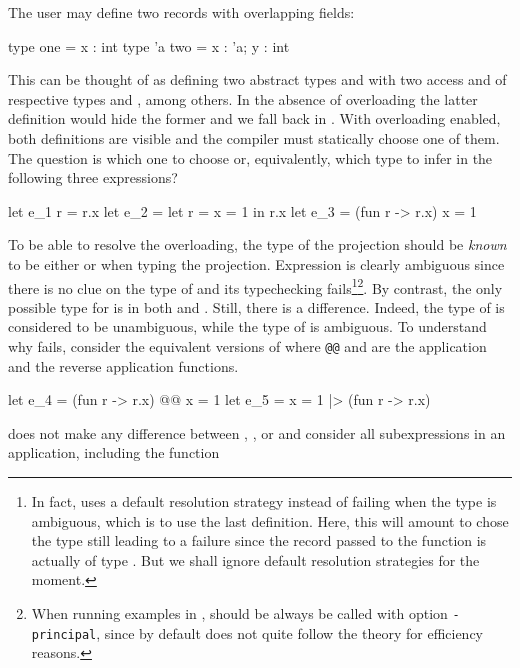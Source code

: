 \documentclass[acmsmall,screen,nonacm]{acmart}
\begin{document}
The user may define two records with overlapping fields:
\begin{program}[input]
type one = {x : int}
type 'a two = {x : 'a; y : int}
\end{program}
This can be thought of as defining two abstract types  and
 with two access  and  of
respective types  and , among
others.
%
In the absence of overloading the latter definition would hide the former
and we fall back in \ML. With overloading enabled, both definitions are
visible and the compiler must statically choose one of them.
%
The question is which one to choose or, equivalently, which type to infer
in the following three expressions? 
\begin{program}[input]
let e_1 r = r.x
let e_2 = let r = {x = 1} in r.x
let e_3 = (fun r -> r.x) {x = 1} 
\end{program}
To be able to resolve the overloading, the type of the projection should be
\emph{known} to be either  or  when typing the
projection.  Expression  is clearly ambiguous since
there is no clue on the type of  and its typechecking
fails\footnote {In fact, \OCaml uses a default resolution strategy instead
of failing when the type is ambiguous, which is to use the last
definition. Here, this will amount to chose the type 
still leading to a failure since the record passed to the function is
actually of type . But we shall ignore default resolution
strategies for the moment.}\footnote {When running examples in \OCaml,
\OCaml should be always be called with option \texttt{-principal}, since by
default \OCaml does not quite follow the theory for efficiency reasons.}.
%
By contrast, the only possible
type for  is  in both  and .
Still, there is a difference.  Indeed, the type of  is considered
to be unambiguous, while the type of  is ambiguous. To
understand why  fails, consider the equivalent versions of
 where \texttt{@@} and \ocaml{|>} are the application and the
reverse application functions.
\begin{program}[input,escapechar={}]
let e_4 = (fun r -> r.x) @@ {x = 1} 
let e_5 = {x = 1} |> (fun r -> r.x) 
\end{program}
\OCaml  does not make any difference between
, , or 
and consider all subexpressions in an application, including the function
\end{document}
